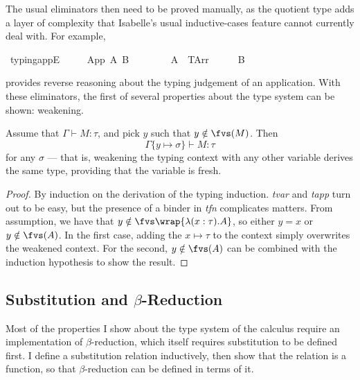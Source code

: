 The usual eliminators then need to be proved manually, as the quotient type adds a layer of complexity that Isabelle's usual inductive-cases feature cannot currently deal with.
For example,

\begin{implementation}
\isamarkupfalse%
\ typing{\isacharunderscore}appE{\isacharcolon}\isanewline
\ \ \ {\isachardoublequoteopen}{\isasymGamma}\ {\isasymturnstile}\ App\ A\ B\ {\isacharcolon}\ {\isasymsigma}{\isachardoublequoteclose}\isanewline
\ \ \ {\isachardoublequoteopen}{\isasymexists}{\isasymtau}{\isachardot}\ {\isacharparenleft}{\isasymGamma}\ {\isasymturnstile}\ A\ {\isacharcolon}\ {\isacharparenleft}TArr\ {\isasymtau}\ {\isasymsigma}{\isacharparenright}{\isacharparenright}\ {\isasymand}\ {\isacharparenleft}{\isasymGamma}\ {\isasymturnstile}\ B\ {\isacharcolon}\ {\isasymtau}{\isacharparenright}{\isachardoublequoteclose}\isanewline
\end{implementation}

provides reverse reasoning about the typing judgement of an application.
With these eliminators, the first of several properties about the type system can be shown: weakening.

\begin{theorem}
Assume that \(\Gamma \vdash M : \tau\), and pick \(y\) such that \(y \notin \fvs(M)\).
Then
\[\Gamma\{y \mapsto \sigma\} \vdash M : \tau\]
for any \(\sigma\) --- that is, weakening the typing context with any other variable derives the same type, providing that the variable is fresh.
\end{theorem}
\begin{proof}
By induction on the derivation of the typing induction.
\emph{tvar} and \emph{tapp} turn out to be easy, but the presence of a binder in \emph{tfn} complicates matters.
From assumption, we have that \(y \notin \fvs\wrap{\lambda (x:\tau). A}\), so either \(y = x\) or \(y \notin \fvs(A)\).
In the first case, adding the \(x \mapsto \tau\) to the context simply overwrites the weakened context.
For the second, \(y \notin \fvs(A)\) can be combined with the induction hypothesis to show the result.
\end{proof}

\subsection{Substitution and \(\beta\)-Reduction}
Most of the properties I show about the type system of the calculus require an implementation of \(\beta\)-reduction, which itself requires substitution to be defined first.
I define a substitution relation inductively, then show that the relation is a function, so that \(\beta\)-reduction can be defined in terms of it.

